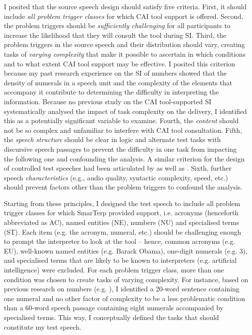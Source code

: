I posited that the source speech design should satisfy five criteria. First, it should include \textit{all problem trigger classes} for which CAI tool support is offered. Second, the problem triggers should be \textit{sufficiently challenging} for all participants to increase the likelihood that they will consult the tool during SI. Third, the problem triggers in the source speech and their distribution should vary, creating tasks of \textit{varying complexity} that make it possible to ascertain in which conditions and to what extent CAI tool support may be effective. I posited this criterion because my past research experience on the SI of numbers \citep{frittella2017numeri,frittella2019a} showed that the density of numerals in a speech unit and the complexity of the elements that accompany it contribute to determining the difficulty in interpreting the information. Because no previous study on the CAI tool-supported SI systematically analysed the impact of task complexity on the delivery, I identified this as a potentially significant variable to examine. Fourth, the \textit{content} should not be so complex and unfamiliar to interfere with CAI tool consultation. Fifth, the \textit{speech structure} should be clear in logic and alternate test tasks with discursive speech passages to prevent the difficulty in one task from impacting the following one and confounding the analysis. A similar criterion for the design of controlled test speeches had been articulated by \citet{seeber2012cognitive} as well as \citet{prandi2017designing}. Sixth, further speech \textit{characteristics} (e.g., audio quality, syntactic complexity, speed, etc.) should prevent factors other than the problem triggers to confound the analysis.

Starting from these principles, I designed the test speech to include all problem trigger classes for which SmarTerp provided support, i.e. acronyms (henceforth abbreviated as AC), named entities (NE), numbers (NU) and specialised terms (ST). Each item (e.g. the acronym, numeral, etc.) should be challenging enough to prompt the interpreter to look at the tool -- hence, common acronyms (e.g. EU), well-known named entities (e.g. Barack Obama), one-digit numerals (e.g. 3), and specialised terms that are likely to be known to interpreters (e.g. artificial intelligence) were excluded. For each problem trigger class, more than one condition was chosen to create tasks of varying complexity. For instance, based on previous research on numbers (e.g. \cite{frittella2017numeri,frittella2019a,frittella2019b}), I identified a 20-word sentence containing one numeral and no other factor of complexity to be a less problematic condition than a 60-word speech passage containing eight numerals accompanied by specialised terms. This way, I conceptually defined the tasks that should constitute my test speech.

